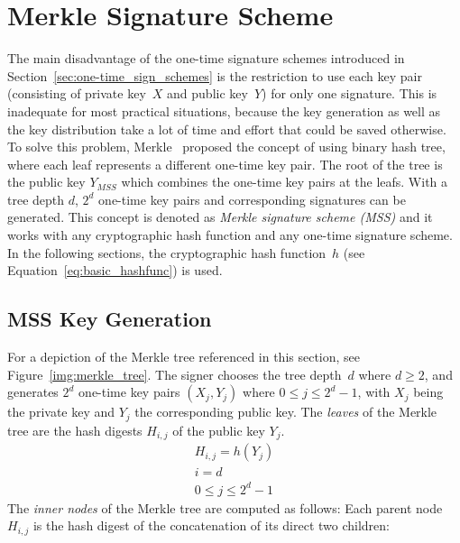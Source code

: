 \section{Merkle Signature Scheme} 
The main disadvantage of the one-time signature schemes introduced in Section~\ref{sec:one-time_sign_schemes} is the restriction to use each key pair (consisting of private key~$X$ and public key~$Y$) for only one signature. This is inadequate for most practical situations, because the key generation as well as the key distribution take a lot of time and effort that could be saved otherwise.
To solve this problem, Merkle~\cite{cha:bg_merkletrees_Merkle_1979} proposed the concept of using binary hash tree, where each leaf represents a different one-time key pair. The root of the tree is the public key $Y_{MSS}$  which combines the one-time key pairs at the leafs. With a tree depth $d$, $2^d$ one-time key pairs and corresponding signatures can be generated. %
This concept is denoted as \textit{Merkle signature scheme (MSS)} and it works with any cryptographic hash function and any one-time signature scheme. In the following sections, the cryptographic hash function~$h$ (see Equation~\ref{eq:basic_hashfunc}) is used. 

\subsection{MSS Key Generation}
For a depiction of the Merkle tree referenced in this section, see Figure~\ref{img:merkle_tree}.
The signer chooses the tree depth~$d$ where $d \geq 2$, and generates $2^d$ one-time key pairs $(X_j, Y_j)$ where $0 \leq j \leq 2^d-1$, with $X_j$ being the private key and $Y_j$ the corresponding public key. The \textit{leaves} of the Merkle tree are the hash digests $H_{i,j}$ of the public key $Y_j$.
\begin{gather}
\label{eq:leaf_merkle_tree:hash_digest_publ_key_Y}
H_{i,j} = h(Y_j) \\
i = d \nonumber \\  
0 \leq j \leq 2^d - 1 \nonumber
\end{gather}
The \textit{inner nodes} of the Merkle tree are computed as follows: Each parent node $H_{i,j}$ is the hash digest of the concatenation of its direct two children: %

